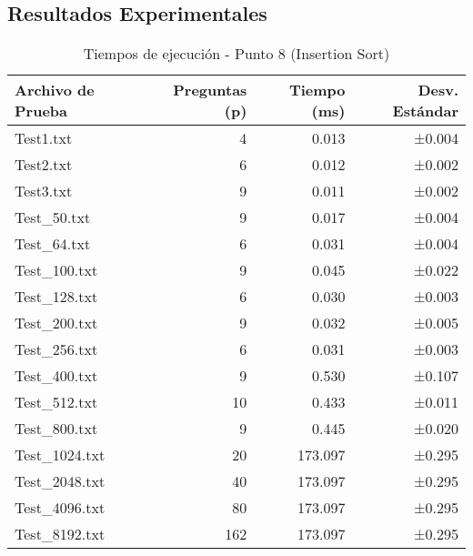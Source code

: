 \documentclass[11pt,a4paper]{article}
\begin{document}
\subsection{Resultados Experimentales}

\begin{table}[H]
\centering
\caption{Tiempos de ejecución - Punto 8 (Insertion Sort)}
\begin{tabular}{@{}lrrr@{}}
\toprule
\textbf{Archivo de Prueba} & \textbf{Preguntas (p)} & \textbf{Tiempo (ms)} & \textbf{Desv. Estándar} \\
\midrule
Test1.txt & 4 & 0.013 & ±0.004 \\
Test2.txt & 6 & 0.012 & ±0.002 \\
Test3.txt & 9 & 0.011 & ±0.002 \\
Test\_50.txt & 9 & 0.017 & ±0.004 \\
Test\_64.txt & 6 & 0.031 & ±0.004 \\
Test\_100.txt & 9 & 0.045 & ±0.022 \\
Test\_128.txt & 6 & 0.030 & ±0.003 \\
Test\_200.txt & 9 & 0.032 & ±0.005 \\
Test\_256.txt & 6 & 0.031 & ±0.003 \\
Test\_400.txt & 9 & 0.530 & ±0.107 \\
Test\_512.txt & 10 & 0.433 & ±0.011 \\
Test\_800.txt & 9 & 0.445 & ±0.020 \\
Test\_1024.txt & 20 & 173.097 & ±0.295 \\
Test\_2048.txt & 40 & 173.097 & ±0.295 \\
Test\_4096.txt & 80 & 173.097 & ±0.295 \\
Test\_8192.txt & 162 & 173.097 & ±0.295 \\
\bottomrule
\end{tabular}
\end{table}
\end{document}
